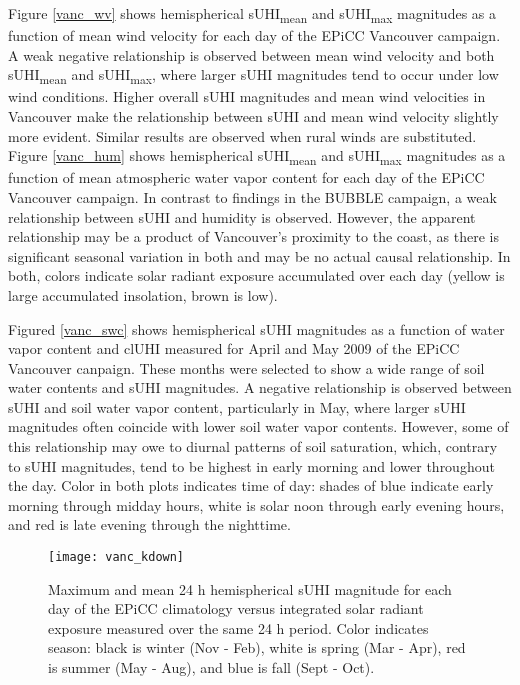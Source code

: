 \begin{bibunit}
Figure \ref{vanc_wv} shows hemispherical sUHI\textsubscript{mean} and sUHI\textsubscript{max} magnitudes as a function of mean wind velocity for each day of the EPiCC Vancouver campaign. A weak negative relationship is observed between mean wind velocity and both sUHI\textsubscript{mean} and sUHI\textsubscript{max}, where larger sUHI magnitudes tend to occur under low wind conditions. Higher overall sUHI magnitudes and mean wind velocities in Vancouver make the relationship between sUHI and mean wind velocity slightly more evident. Similar results are observed when rural winds are substituted. Figure \ref{vanc_hum} shows hemispherical sUHI\textsubscript{mean} and sUHI\textsubscript{max} magnitudes as a function of mean atmospheric water vapor content for each day of the EPiCC Vancouver campaign. In contrast to findings in the BUBBLE campaign, a weak relationship between sUHI and humidity is observed. However, the apparent relationship may be a product of Vancouver's proximity to the coast, as there is significant seasonal variation in both  and may be no actual causal relationship. In both, colors indicate solar radiant exposure accumulated over each day (yellow is large accumulated insolation, brown is low).

Figured \ref{vanc_swc} shows hemispherical sUHI magnitudes as a function of water vapor content and clUHI measured for April and May 2009 of the EPiCC Vancouver canpaign. These months were selected to show a wide range of soil water contents and sUHI magnitudes. A negative relationship is observed between sUHI and soil water vapor content, particularly in May, where larger sUHI magnitudes often coincide with lower soil water vapor contents. However, some of this relationship may owe to diurnal patterns of soil saturation, which, contrary to sUHI magnitudes, tend to be highest in early morning and lower throughout the day. Color in both plots indicates time of day: shades of blue indicate early morning through midday hours, white is solar noon through early evening hours, and red is late evening through the nighttime.

\begin{figure}[H]
	\centering
	\texttt{[image: vanc\_kdown]}
	\caption{Maximum and mean 24 \si{\hour} hemispherical sUHI magnitude for each day of the EPiCC climatology versus integrated solar radiant exposure measured over the same 24 \si{\hour} period. Color indicates season: black is winter (Nov - Feb), white is spring (Mar - Apr), red is summer (May - Aug), and blue is fall (Sept - Oct).}
	\label{vanc_sol}
\end{figure}


\end{bibunit}
